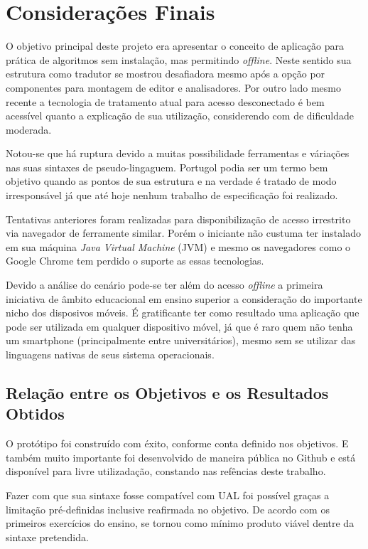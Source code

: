 
\chapter{Considerações Finais}

O objetivo principal deste projeto era apresentar o conceito de aplicação para prática de algoritmos sem instalação, mas permitindo \textit{offline}. Neste sentido sua estrutura como tradutor se mostrou desafiadora mesmo após a opção por componentes para montagem de editor e analisadores. Por outro lado mesmo recente a tecnologia de tratamento atual para acesso desconectado é bem acessível quanto a explicação de sua utilização, considerendo com de dificuldade moderada.

Notou-se que há ruptura devido a muitas possibilidade ferramentas e váriações nas suas sintaxes de pseudo-lingaguem. Portugol podia ser um termo bem objetivo quando as pontos de sua estrutura e na verdade é tratado de modo irresponsável já que até hoje nenhum trabalho de especificação foi realizado.

Tentativas anteriores foram realizadas para disponibilização de acesso irrestrito via navegador de ferramente similar. Porém o iniciante não custuma ter instalado em sua máquina \textit{Java Virtual Machine} (JVM) e mesmo os navegadores como o Google Chrome tem perdido o suporte as essas tecnologias.

Devido a análise do cenário pode-se ter além do acesso \textit{offline} a primeira iniciativa de âmbito educacional em ensino superior a consideração do importante nicho dos disposivos móveis. É gratificante ter como resultado uma aplicação que pode ser utilizada em qualquer dispositivo móvel, já que é raro quem não tenha um smartphone (principalmente entre universitários), mesmo sem se utilizar das linguagens nativas de seus sistema operacionais.

\section{Relação entre os Objetivos e os Resultados Obtidos}

O protótipo foi construído com éxito, conforme conta definido nos objetivos. E também muito importante foi desenvolvido de maneira pública no Github e está disponível para livre utilizadação, constando nas refências deste trabalho.

Fazer com que sua sintaxe fosse compatível com UAL foi possível graças a limitação pré-definidas inclusive reafirmada no objetivo. De acordo com os primeiros exercícios do ensino, se tornou como mínimo produto viável dentre da sintaxe pretendida.

